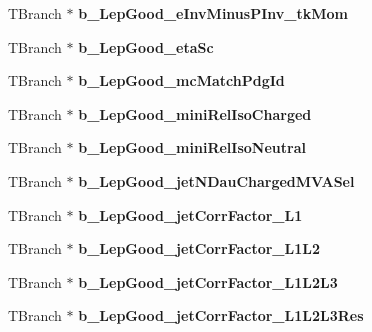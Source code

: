 \begin{DoxyCompactItemize}
\item 
\hypertarget{classMiniTree_a4dc7d8b601bb27d85f877db992cdc2bf}{}\label{classMiniTree_a4dc7d8b601bb27d85f877db992cdc2bf} 
T\+Branch $\ast$ {\bfseries b\+\_\+\+Lep\+Good\+\_\+e\+Inv\+Minus\+P\+Inv\+\_\+tk\+Mom}
\item 
\hypertarget{classMiniTree_a9047a61fd5b19bc45599983b39cc2179}{}\label{classMiniTree_a9047a61fd5b19bc45599983b39cc2179} 
T\+Branch $\ast$ {\bfseries b\+\_\+\+Lep\+Good\+\_\+eta\+Sc}
\item 
\hypertarget{classMiniTree_abd531ede525ea32efde5428e7a4cca6f}{}\label{classMiniTree_abd531ede525ea32efde5428e7a4cca6f} 
T\+Branch $\ast$ {\bfseries b\+\_\+\+Lep\+Good\+\_\+mc\+Match\+Pdg\+Id}
\item 
\hypertarget{classMiniTree_a93808224473c1c5613befd263d08bc97}{}\label{classMiniTree_a93808224473c1c5613befd263d08bc97} 
T\+Branch $\ast$ {\bfseries b\+\_\+\+Lep\+Good\+\_\+mini\+Rel\+Iso\+Charged}
\item 
\hypertarget{classMiniTree_a80053260a66077a7a51fd539eb3f0ed6}{}\label{classMiniTree_a80053260a66077a7a51fd539eb3f0ed6} 
T\+Branch $\ast$ {\bfseries b\+\_\+\+Lep\+Good\+\_\+mini\+Rel\+Iso\+Neutral}
\item 
\hypertarget{classMiniTree_adb33607b06028f6dfd4b26157fe03d6d}{}\label{classMiniTree_adb33607b06028f6dfd4b26157fe03d6d} 
T\+Branch $\ast$ {\bfseries b\+\_\+\+Lep\+Good\+\_\+jet\+N\+Dau\+Charged\+M\+V\+A\+Sel}
\item 
\hypertarget{classMiniTree_ae46956823428bb04c778a09dc3a95060}{}\label{classMiniTree_ae46956823428bb04c778a09dc3a95060} 
T\+Branch $\ast$ {\bfseries b\+\_\+\+Lep\+Good\+\_\+jet\+Corr\+Factor\+\_\+\+L1}
\item 
\hypertarget{classMiniTree_a74f9428dbcf6776678b361c181644efc}{}\label{classMiniTree_a74f9428dbcf6776678b361c181644efc} 
T\+Branch $\ast$ {\bfseries b\+\_\+\+Lep\+Good\+\_\+jet\+Corr\+Factor\+\_\+\+L1\+L2}
\item 
\hypertarget{classMiniTree_ae4734c36eacfbc47294f888cbe4577e2}{}\label{classMiniTree_ae4734c36eacfbc47294f888cbe4577e2} 
T\+Branch $\ast$ {\bfseries b\+\_\+\+Lep\+Good\+\_\+jet\+Corr\+Factor\+\_\+\+L1\+L2\+L3}
\item 
\hypertarget{classMiniTree_a9b8841d50050b1b0f32cb01330130b78}{}\label{classMiniTree_a9b8841d50050b1b0f32cb01330130b78} 
T\+Branch $\ast$ {\bfseries b\+\_\+\+Lep\+Good\+\_\+jet\+Corr\+Factor\+\_\+\+L1\+L2\+L3\+Res}
\item 
\hypertarget{classMiniTree_a858c4ce16625e14f138c98969ff9fc8e}{}\label{classMiniTree_a858c4ce16625e14f138c98969ff9fc8e} 

\end{DoxyCompactItemize}
